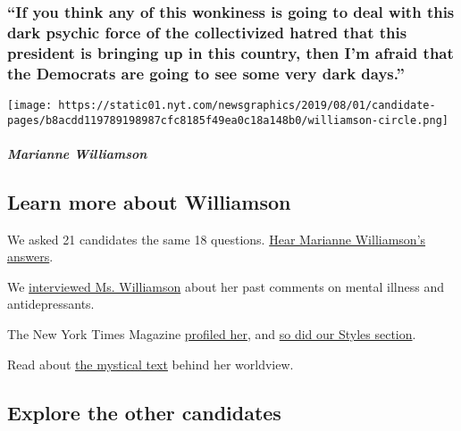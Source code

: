 \hypertarget{if-you-think-any-of-this-wonkiness-is-going-to-deal-with-this-dark-psychic-force-of-the-collectivized-hatred-that-this-president-is-bringing-up-in-this-country-then-im-afraid-that-the-democrats-are-going-to-see-some-very-dark-days}{%
\subsubsection{``If you think any of this wonkiness is going to deal
with this dark psychic force of the collectivized hatred that this
president is bringing up in this country, then I'm afraid that the
Democrats are going to see some very dark
days.''}\label{if-you-think-any-of-this-wonkiness-is-going-to-deal-with-this-dark-psychic-force-of-the-collectivized-hatred-that-this-president-is-bringing-up-in-this-country-then-im-afraid-that-the-democrats-are-going-to-see-some-very-dark-days}}

\texttt{[image: https://static01.nyt.com/newsgraphics/2019/08/01/candidate-pages/b8acdd119789198987cfc8185f49ea0c18a148b0/williamson-circle.png]}

\hypertarget{marianne-williamson-1}{%
\subparagraph{Marianne Williamson}\label{marianne-williamson-1}}

\hypertarget{learn-more-about-williamson}{%
\subsection{Learn more about
Williamson}\label{learn-more-about-williamson}}

We asked 21 candidates the same 18 questions.
\href{https://www.nytimes.com/interactive/2019/us/politics/marianne-williamson-2020-campaign.html}{Hear
Marianne Williamson's answers}.

We
\href{https://www.nytimes.com/2019/07/27/us/politics/marianne-williamson-mental-health.html}{interviewed
Ms. Williamson} about her past comments on mental illness and
antidepressants.

The New York Times Magazine
\href{https://www.nytimes.com/2019/09/03/magazine/marianne-williamson-2020.html}{profiled
her}, and
\href{https://www.nytimes.com/2019/06/28/style/marianne-williamson-debate-president.html}{so
did our Styles section}.

Read about
\href{https://www.nytimes.com/2019/07/05/nyregion/marianne-williamson.html}{the
mystical text} behind her worldview.

\hypertarget{explore-the-other-candidates}{%
\subsection{Explore the other
candidates}\label{explore-the-other-candidates}}

